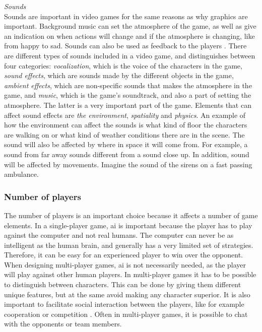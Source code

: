 \emph{Sounds}\\
Sounds are important in video games for the same reasons as why graphics are important. Background music can set the atmosphere of the game, as well as give an indication on when actions will change and if the atmosphere is changing, like from happy to sad. Sounds can also be used as feedback to the players \cite{umlapproach}. There are different types of sounds included in a video game, and \cite{understandingvg} distinguishes between four categories:
\emph{vocalization}, which is the voice of the characters in the game,
\emph{sound effects}, which are sounds made by the different objects in the game, \emph{ambient effects}, which are non-specific sounds that makes the atmosphere in the game, and \emph{music}, which is the game's soundtrack, and also a part of setting the atmosphere. The latter is a very important part of the game. Elements that can affect sound effects are \emph{the environment}, \emph{spatiality} and \emph{physics}. An example of how the environment can affect the sounds is what kind of floor the characters are walking on or what kind of weather conditions there are in the scene. The sound will also be affected by where in space it will come from. For example, a sound from far away sounds different from a sound close up. In addition, sound will be affected by movements. Imagine the sound of the sirens on a fast passing ambulance.

\subsubsection{Number of players}
\label{subsec:numbers}
The number of players is an important choice because it affects a number of game elements. In a single-player game, \ac{ai} is important because the player has to play against the computer and not real humans. The computer can never be as intelligent as the human brain, and generally has a very limited set of strategies. Therefore, it can be easy for an experienced player to win over the opponent. When designing multi-player games, \ac{ai} is not necessarily needed, as the player will play against other human players. In multi-player games it has to be possible to distinguish between characters. This can be done by giving them different unique features, but at the same avoid making any character superior. It is also important to facilitate social interaction between the players, like for example cooperation or competition \cite{understandingvg}. Often in multi-player games, it is possible to chat with the opponents or team members. 

